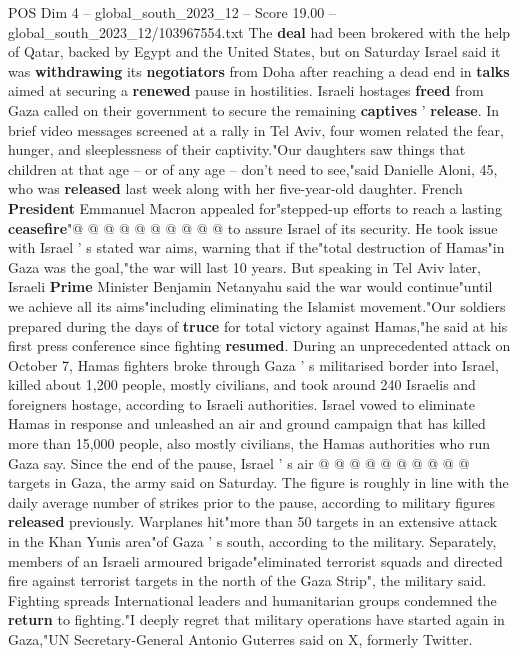 \begin{textsample}{POS Dim 4 – global\_south\_2023\_12 – Score 19.00 – global\_south\_2023\_12/103967554.txt}
The \textbf{deal} had been brokered with the help of Qatar, backed by Egypt and the United States, but on Saturday Israel said it was \textbf{withdrawing} its \textbf{negotiators} from Doha after reaching a dead end in \textbf{talks} aimed at securing a \textbf{renewed} pause in hostilities.
Israeli hostages \textbf{freed} from Gaza called on their government to secure the remaining \textbf{captives} ' \textbf{release}.
In brief video messages screened at a rally in Tel Aviv, four women related the fear, hunger, and sleeplessness of their captivity."Our daughters saw things that children at that age -- or of any age -- don't need to see,"said Danielle Aloni, 45, who was \textbf{released} last week along with her five-year-old daughter.
French \textbf{President} Emmanuel Macron appealed for"stepped-up efforts to reach a lasting \textbf{ceasefire}"@ @ @ @ @ @ @ @ @ @ to assure Israel of its security.
He took issue with Israel ' s stated war aims, warning that if the"total destruction of Hamas"in Gaza was the goal,"the war will last 10 years.
But speaking in Tel Aviv later, Israeli \textbf{Prime} Minister Benjamin Netanyahu said the war would continue"until we achieve all its aims"including eliminating the Islamist movement."Our soldiers prepared during the days of \textbf{truce} for total victory against Hamas,"he said at his first press conference since fighting \textbf{resumed}.
During an unprecedented attack on October 7, Hamas fighters broke through Gaza ' s militarised border into Israel, killed about 1,200 people, mostly civilians, and took around 240 Israelis and foreigners hostage, according to Israeli authorities.
Israel vowed to eliminate Hamas in response and unleashed an air and ground campaign that has killed more than 15,000 people, also mostly civilians, the Hamas authorities who run Gaza say.
Since the end of the pause, Israel ' s air @ @ @ @ @ @ @ @ @ @ targets in Gaza, the army said on Saturday.
The figure is roughly in line with the daily average number of strikes prior to the pause, according to military figures \textbf{released} previously.
Warplanes hit"more than 50 targets in an extensive attack in the Khan Yunis area"of Gaza ' s south, according to the military.
Separately, members of an Israeli armoured brigade"eliminated terrorist squads and directed fire against terrorist targets in the north of the Gaza Strip", the military said.
Fighting spreads International leaders and humanitarian groups condemned the \textbf{return} to fighting."I deeply regret that military operations have started again in Gaza,"UN Secretary-General Antonio Guterres said on X, formerly Twitter.

\end{textsample}
